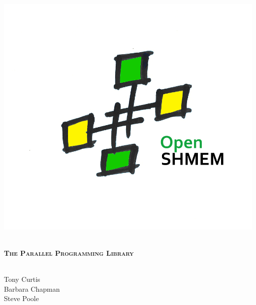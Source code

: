 \begin{titlepage}

\begin{center}

\includegraphics{OpenSHMEM_Pound}

\HRule \\[1.0cm]
{\huge \bfseries\scshape The \openshmem
\vspace{0.1in}
Parallel Programming Library}\\[0.4cm]
\HRule \\[1.5cm]

\begin{minipage}{0.4\textwidth}
\begin{flushleft} \large
Tony Curtis \\
Barbara Chapman \\
Steve Poole \\
\end{flushleft}
\end{minipage}


\vfill


\end{center}

\end{titlepage}
